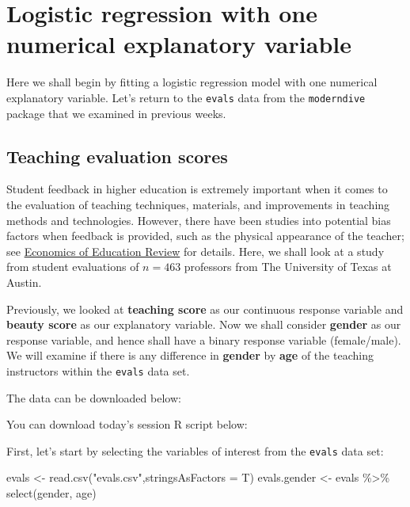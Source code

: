\documentclass[
  letterpaper,
  DIV=11,
  numbers=noendperiod]{scrartcl}
\newenvironment{Shaded}{\begin{snugshade}}{\end{snugshade}}
\newcommand{\AttributeTok}[1]{\textcolor[rgb]{0.40,0.45,0.13}{#1}}
\newcommand{\FunctionTok}[1]{\textcolor[rgb]{0.28,0.35,0.67}{#1}}
\newcommand{\NormalTok}[1]{\textcolor[rgb]{0.00,0.23,0.31}{#1}}
\newcommand{\OtherTok}[1]{\textcolor[rgb]{0.00,0.23,0.31}{#1}}
\newcommand{\SpecialCharTok}[1]{\textcolor[rgb]{0.37,0.37,0.37}{#1}}
\newcommand{\StringTok}[1]{\textcolor[rgb]{0.13,0.47,0.30}{#1}}
\begin{document}
\section{Logistic regression with one numerical explanatory
variable}\label{logistic-regression-with-one-numerical-explanatory-variable}

Here we shall begin by fitting a logistic regression model with one
numerical explanatory variable. Let's return to the \texttt{evals} data
from the \texttt{moderndive} package that we examined in previous weeks.

\subsection{Teaching evaluation
scores}\label{teaching-evaluation-scores}

Student feedback in higher education is extremely important when it
comes to the evaluation of teaching techniques, materials, and
improvements in teaching methods and technologies. However, there have
been studies into potential bias factors when feedback is provided, such
as the physical appearance of the teacher; see
\href{https://www.journals.elsevier.com/economics-of-education-review/}{Economics
of Education Review} for details. Here, we shall look at a study from
student evaluations of \(n=463\) professors from The University of Texas
at Austin.

Previously, we looked at \textbf{teaching score} as our continuous
response variable and \textbf{beauty score} as our explanatory variable.
Now we shall consider \textbf{gender} as our response variable, and
hence shall have a binary response variable (female/male). We will
examine if there is any difference in \textbf{gender} by \textbf{age} of
the teaching instructors within the \texttt{evals} data set.

The data can be downloaded below:

You can download today's session R script below:

First, let's start by selecting the variables of interest from the
\texttt{evals} data set:

\begin{Shaded}
\begin{Highlighting}[]
\NormalTok{evals }\OtherTok{\textless{}{-}} \FunctionTok{read.csv}\NormalTok{(}\StringTok{"evals.csv"}\NormalTok{,}\AttributeTok{stringsAsFactors =}\NormalTok{ T)}
\NormalTok{evals.gender }\OtherTok{\textless{}{-}}\NormalTok{ evals }\SpecialCharTok{\%\textgreater{}\%}
                  \FunctionTok{select}\NormalTok{(gender, age)}
\end{Highlighting}
\end{Shaded}
\end{document}
